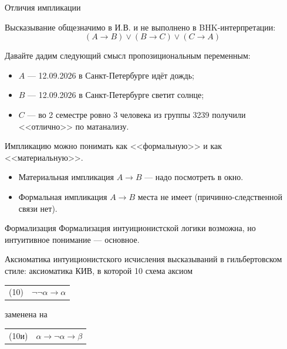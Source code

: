 \documentclass[aspectratio=169]{beamer}
\begin{document}
\begin{frame}{Отличия импликации}

Высказывание общезначимо в И.В. и не выполнено в BHK-интерпретации:
$$(A \rightarrow B) \vee (B \rightarrow C) \vee (C \rightarrow A)$$\pause

Давайте дадим следующий смысл пропозициональным переменным:
\begin{itemize}
\item $A$ --- 12.09.2026 в Санкт-Петербурге идёт дождь;
\item $B$ --- 12.09.2026 в Санкт-Петербурге светит солнце;
\item $C$ --- во 2 семестре ровно 3 человека из группы 3239 получили <<отлично>> по матанализу.
\end{itemize}\pause

Импликацию можно понимать как <<формальную>> и как <<материальную>>.
\begin{itemize}
\item Материальная импликация $A\rightarrow B$ --- надо посмотреть в окно.\pause

\item Формальная импликация $A\rightarrow B$ места не имеет (причинно-следственной связи нет).
\end{itemize}

\end{frame}

\begin{frame}{Формализация}
Формализация интуиционистской логики возможна, но интуитивное понимание --- основное.

\begin{defrus}Аксиоматика интуиционистского исчисления высказываний в гильбертовском стиле: 
аксиоматика КИВ, в которой 10 схема аксиом

\begin{center}\begin{tabular}{ll}
(10) & $\neg \neg \alpha \rightarrow \alpha$
\end{tabular}\end{center}

заменена на 

\begin{center}\begin{tabular}{ll}
(10и) & $\alpha \rightarrow \neg\alpha \rightarrow \beta$
\end{tabular}\end{center}
\end{defrus}
\end{frame}
\end{document}
